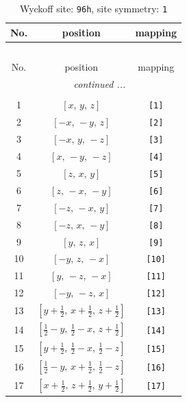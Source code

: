 \documentclass[fleqn,8pt]{jsarticle}
\begin{document}
\begin{longtable}{ccc}
\caption{Wyckoff site: {\tt 96h}, site symmetry: {\tt 1}}
 \\
 \hline \hline
No. & position & mapping \\ \hline \endfirsthead

\multicolumn{2}{l}{\tablename\ \thetable{}} \\
 \hline \hline
No. & position & mapping \\ \hline \endhead

 \hline \hline
\multicolumn{2}{r}{\footnotesize\it continued ...} \\ \endfoot

 \hline \hline
\multicolumn{2}{r}{} \\ \endlastfoot

1 & $\left[ x,\, y,\, z \right]$ & {\tt [1]} \\ \hline
2 & $\left[ - x,\, - y,\, z \right]$ & {\tt [2]} \\ \hline
3 & $\left[ - x,\, y,\, - z \right]$ & {\tt [3]} \\ \hline
4 & $\left[ x,\, - y,\, - z \right]$ & {\tt [4]} \\ \hline
5 & $\left[ z,\, x,\, y \right]$ & {\tt [5]} \\ \hline
6 & $\left[ z,\, - x,\, - y \right]$ & {\tt [6]} \\ \hline
7 & $\left[ - z,\, - x,\, y \right]$ & {\tt [7]} \\ \hline
8 & $\left[ - z,\, x,\, - y \right]$ & {\tt [8]} \\ \hline
9 & $\left[ y,\, z,\, x \right]$ & {\tt [9]} \\ \hline
10 & $\left[ - y,\, z,\, - x \right]$ & {\tt [10]} \\ \hline
11 & $\left[ y,\, - z,\, - x \right]$ & {\tt [11]} \\ \hline
12 & $\left[ - y,\, - z,\, x \right]$ & {\tt [12]} \\ \hline
13 & $\left[ y + \frac{1}{2},\, x + \frac{1}{2},\, z + \frac{1}{2} \right]$ & {\tt [13]} \\ \hline
14 & $\left[ \frac{1}{2} - y,\, \frac{1}{2} - x,\, z + \frac{1}{2} \right]$ & {\tt [14]} \\ \hline
15 & $\left[ y + \frac{1}{2},\, \frac{1}{2} - x,\, \frac{1}{2} - z \right]$ & {\tt [15]} \\ \hline
16 & $\left[ \frac{1}{2} - y,\, x + \frac{1}{2},\, \frac{1}{2} - z \right]$ & {\tt [16]} \\ \hline
17 & $\left[ x + \frac{1}{2},\, z + \frac{1}{2},\, y + \frac{1}{2} \right]$ & {\tt [17]} \\ \hline

\end{longtable}
\end{document}
